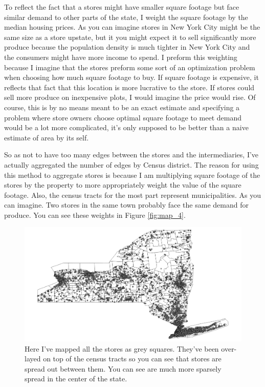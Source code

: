 \documentclass{report}
\begin{document}
To reflect the fact that a stores might have smaller square footage but face similar demand to other parts of the state, I weight the square footage by the median housing prices. As you can imagine stores in New York City might be the same size as a store upstate, but it you might expect it to sell significantly more produce because the population density is much tighter in New York City and the consumers might have more income to spend. I preform this weighting because I imagine that the stores preform some sort of an optimization problem when choosing how much square footage to buy. If square footage is expensive, it reflects that fact that this location is more lucrative to the store. If stores could sell more produce on inexpensive plots, I would imagine the price would rise. Of course, this is by no means meant to be an exact estimate and specifying a problem where store owners choose optimal square footage to meet demand would be a lot more complicated, it's only supposed to be better than a naive estimate of area by its self.

So as not to have too many edges between the stores and the intermediaries, I've actually aggregated the number of edges by Census district. The reason for using this method to aggregate stores is because I am multiplying square footage of the stores by the property to more appropriately weight the value of the square footage. Also, the census tracts for the most part represent municipalities. As you can imagine. Two stores in the same town probably face the same demand for produce. You can see these weights in Figure \ref{fig:map_4}.

\begin{figure}
\centering
\begin{framed}
\includegraphics[scale=.39]{map_3}
\caption{Here I've mapped all the stores as grey squares. They've been over-layed on top of the census tracts so you can see that stores are spread out between them. You can see are much more sparsely spread in the center of the state.}
\label{fig:map_3}
\end{framed}
\end{figure}
\end{document}
